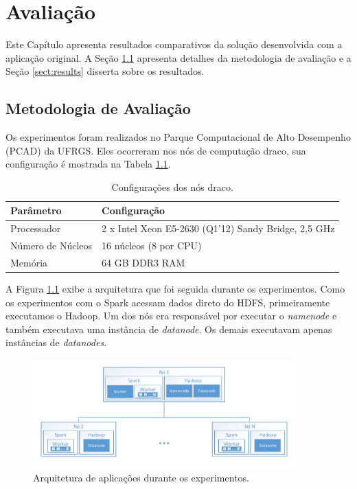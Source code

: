 \chapter{Avaliação} \label{ch:evaluation}

Este Capítulo apresenta resultados comparativos da solução desenvolvida com a 
aplicação original. A Seção \ref{sect:methodology} apresenta detalhes da 
metodologia de avaliação e a Seção \ref{sect:results} disserta sobre os 
resultados.


\section{Metodologia de Avaliação} \label{sect:methodology}

Os experimentos foram realizados no Parque Computacional de Alto Desempenho 
(PCAD) da UFRGS. Eles ocorreram nos nós de computação draco, sua 
configuração é mostrada na Tabela \ref{tab:draco_config}.

\begin{table}[H]
\centering
\begin{tabular}{l l} \toprule
\textbf{Parâmetro}  &  \textbf{Configuração} \\ 
\midrule
Processador     & 2 x Intel Xeon E5-2630 (Q1'12) Sandy Bridge, 2,5 GHz  
\\
Número de Núcleos    & 16 núcleos (8 por CPU)  \\
Memória       & 64 GB DDR3 RAM   \\
\end{tabular}
\caption{Configurações dos nós draco.}
\label{tab:draco_config}
\end{table}


A Figura \ref{fig:experiment_arch} exibe a arquitetura que foi seguida durante 
os experimentos. Como os experimentos com o Spark acessam dados direto do HDFS, 
primeiramente executamos o Hadoop. Um dos nós era responsável por executar o 
\emph{namenode} e também executava uma instância de \emph{datanode}. Os demais 
executavam apenas instâncias de \emph{datanodes}.


\begin{figure}[ht]
\centerline{
\includegraphics[width=0.9\textwidth]{./img/experiments_arch.pdf}}
 \caption{Arquitetura de aplicações durante os experimentos.}
 \label{fig:experiment_arch}
\end{figure}


